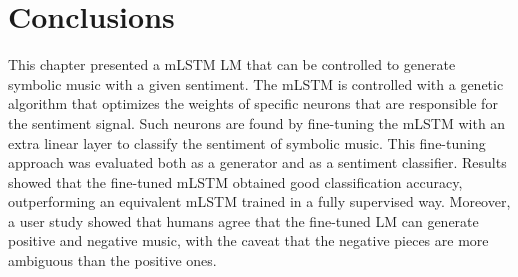 \section{Conclusions}

This chapter presented a mLSTM LM that can be controlled to generate symbolic music with a given sentiment. The mLSTM is controlled with a genetic algorithm that optimizes the weights of specific neurons that are responsible for the sentiment signal. Such neurons are found by fine-tuning the mLSTM with an extra linear layer to classify the sentiment of symbolic music. This fine-tuning approach was evaluated both as a generator and as a sentiment classifier. Results showed that the fine-tuned mLSTM obtained good classification accuracy, outperforming an equivalent mLSTM trained in a fully supervised way. Moreover, a user study showed that humans agree that the fine-tuned LM can generate positive and negative music, with the caveat that the negative pieces are more ambiguous than the positive ones.

